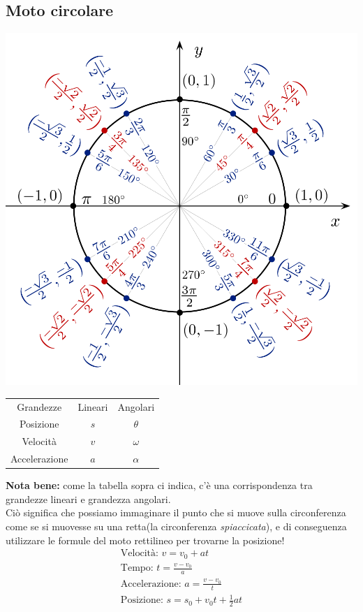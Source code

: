 \subsection{Moto circolare}
\begin{center}
\includegraphics[width=0.8\linewidth]{Cinematica/circonferenza-goniometrica.png}
\end{center}
\begin{center}
\begin{tabular}{ c c c }
    Grandezze & Lineari & Angolari \\
    Posizione & $s$ & $\theta$ \\
    Velocità & $v$ & $\omega$ \\
    Accelerazione & $a$ & $\alpha$ \\
\end{tabular}
\end{center}
\textbf{Nota bene: } come la tabella sopra ci indica, c'è una corrispondenza tra grandezze lineari e grandezza angolari. \\ Ciò significa che possiamo immaginare il punto che si muove sulla circonferenza come se si muovesse su una retta(la circonferenza \textit{spiaccicata}), e di conseguenza utilizzare le formule del moto rettilineo per trovarne la posizione!
\begin{gather*}
    \text{Velocità: } v = v_0 + a t \\
    \text{Tempo: } t = \frac{v - v_0}{a} \\
    \text{Accelerazione: } a = \frac{v - v_0}{t} \\
    \text{Posizione: } s = s_0 + v_0 t + \frac{1}{2} a t \\
\end{gather*}
